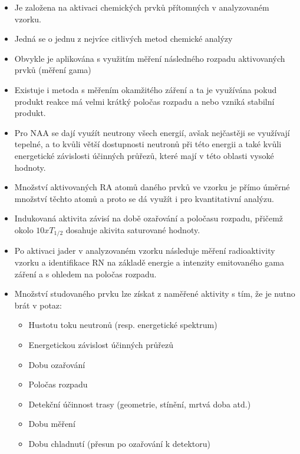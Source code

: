 \begin{itemize}
    \item Je založena na aktivaci chemických prvků přítomných v analyzovaném vzorku. 
    \item Jedná se o jednu z nejvíce citlivých metod chemické analýzy
    \item Obvykle je aplikována s využitím měření následného rozpadu aktivovaných prvků (měření gama)
    \item Existuje i metoda s měřením okamžitého záření a ta je využívána pokud produkt reakce má velmi krátký poločas rozpadu a nebo vzniká stabilní produkt.
    \item Pro NAA se dají vyuźít neutrony všech energií, avšak nejčastěji se využívají tepelné, a to kvůli větší dostupnosti neutronů při této energii a také kvůli energetické závislosti účinných průřezů, které mají v této oblasti vysoké hodnoty.
    \item Množství aktivovaných RA atomů daného prvků ve vzorku je přímo úměrné množství těchto atomů a proto se dá využít i pro kvantitativní analýzu.
    \item Indukovaná aktivita závisí na době ozařování a poločasu rozpadu, přičemž okolo $10x T_{1/2}$ dosahuje akivita saturované hodnoty.
    \item Po aktivaci jader v analyzovaném vzorku následuje měření radioaktivity vzorku a identifikace RN na základě energie a intenzity emitovaného gama záření a s ohledem na poločas rozpadu.
    \item Množství studovaného prvku lze získat z naměřené aktivity s tím, že je nutno brát v potaz:
    \begin{itemize}
        \item Hustotu toku neutronů (resp. energetické spektrum)
        \item Energetickou závislost účinných průřezů
        \item Dobu ozařování
        \item Poločas rozpadu
        \item Detekční účinnost trasy (geometrie, stínění, mrtvá doba atd.)
        \item Dobu měření
        \item Dobu chladnutí (přesun po ozařování k detektoru)
    \end{itemize}
\end{itemize}
 
